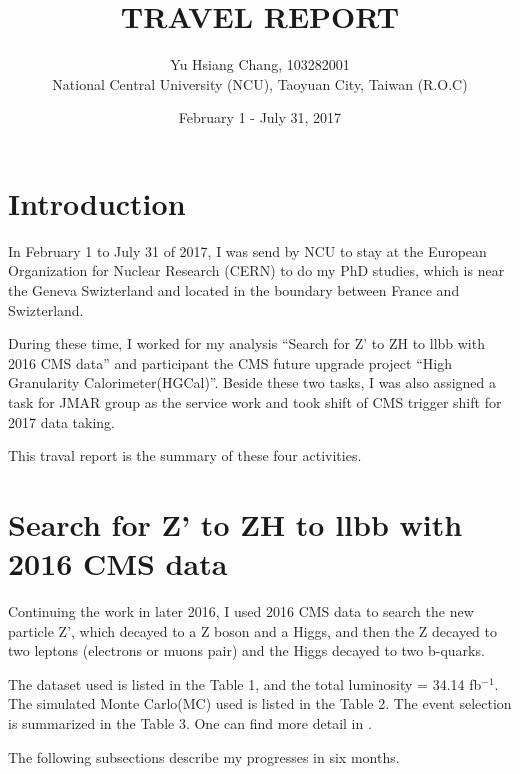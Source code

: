 \documentclass{article}
\title{TRAVEL REPORT}
\author{Yu Hsiang Chang, 103282001 \\
National Central University (NCU), Taoyuan City, Taiwan (R.O.C)}
\date{February 1 - July 31, 2017}
\begin{document}
\maketitle

\newpage

\tableofcontents
\listoffigures
\listoftables

\newpage





\section{Introduction}
In February 1 to July 31 of 2017, I was send by NCU to stay at the European Organization for Nuclear Research (CERN) to do my PhD studies, which is near the Geneva Swizterland and located in the boundary between France and Swizterland.    

During these time, I worked for my analysis ``Search for Z' to ZH to llbb with 2016 CMS data'' and participant the CMS future upgrade project ``High Granularity Calorimeter(HGCal)''. Beside these two tasks, I was also assigned a task for JMAR group as the service work and took shift of CMS trigger shift for 2017 data taking.

This traval report is the summary of these four activities.     

%


\section{Search for Z' to ZH to llbb with 2016 CMS data}
Continuing the work in later 2016, I used 2016 CMS data to search the new particle Z', which decayed to a Z boson and a Higgs, and then the Z decayed to two leptons (electrons or muons pair) and the Higgs decayed to two b-quarks. 

The dataset used is listed in the Table 1, and the total luminosity = 34.14 fb$^{-1}$. The simulated Monte Carlo(MC) used is listed in the Table 2. The event selection is summarized in the Table 3. One can find more detail in \cite{Alberto ZH paper with 2015 data}. 

The following subsections describe my progresses in six months.
\end{document}
